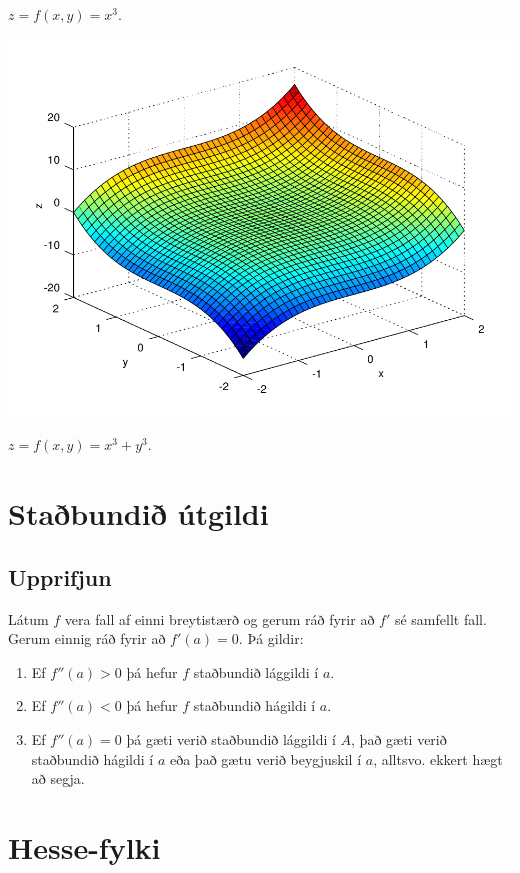 \documentclass[a4paper,10pt,icelandic]{sphinxmanual}
\begin{document}
\(z = f(x,y) = x^3\).

{\hfill\includegraphics[width=0.600\linewidth]{sodull2.png}\hfill}

\(z = f(x,y) = x^3+y^3\).


\section{Staðbundið útgildi}
\label{Kafli3:id3}

\subsection{Upprifjun}
\label{Kafli3:id4}
Látum \(f\) vera fall af einni breytistærð og gerum ráð fyrir að
\(f'\) sé samfellt fall. Gerum einnig ráð fyrir að \(f'(a)=0\).
Þá gildir:
\begin{enumerate}
\item {} 
Ef \(f''(a)>0\) þá hefur \(f\) staðbundið lággildi í
\(a\).

\item {} 
Ef \(f''(a)<0\) þá hefur \(f\) staðbundið hágildi í
\(a\).

\item {} 
Ef \(f''(a)=0\) þá gæti verið staðbundið lággildi í \(A\),
það gæti verið staðbundið hágildi í \(a\) eða það gætu verið
beygjuskil í \(a\), alltsvo. ekkert hægt að segja.

\end{enumerate}


\section{Hesse-fylki}
\label{Kafli3:hesse-fylki}
\end{document}
